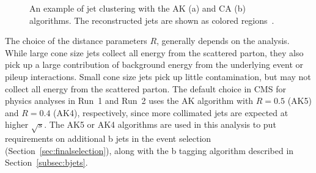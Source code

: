 
\begin{figure}[!htb]
\centering
{}
\caption{An example of jet clustering with the AK (a) and CA (b) algorithms. The reconstructed jets are shown as colored regions~\cite{Cacciari:2008gp}.}
\label{fig:jetalgos}
\end{figure}

The choice of the distance parameters $R$, generally depends on the analysis. While large cone size jets collect all energy from the scattered parton, they also pick up a large contribution of background energy from the underlying event or pileup interactions. Small cone size jets pick up little contamination, but may not collect all energy from the scattered parton. 
The default choice in CMS for physics analyses in Run~1 and Run~2 uses the AK algorithm with $R = 0.5$ (AK5) and $R = 0.4$ (AK4), respectively, since more collimated jets are expected at higher $\sqrt{s}$. The AK5 or AK4 algorithms are used in this analysis to put requirements on additional b jets in the event selection (Section~\ref{sec:finalselection}), along with the b tagging algorithm described in Section~\ref{subsec:bjets}.


